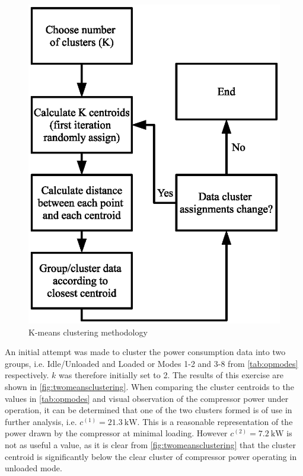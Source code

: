 \begin{figure}
\includegraphics[width = .9\columnwidth]{./Images/ClusteringOverview.eps}
\caption{K-means clustering methodology}
\label{fig:clusteroverview}
\end{figure}

An initial attempt was made to cluster the power consumption data into two groups, i.e. Idle/Unloaded and Loaded or Modes 1-2 and 3-8 from \autoref{tab:opmodes} respectively. $k$ was therefore initially set to 2. The results of this exercise are shown in \autoref{fig:twomeansclustering}. When comparing the cluster centroids to the values in \autoref{tab:opmodes} and visual observation of the compressor power under operation, it can be determined that one of the two clusters formed is of use in further analysis, i.e. $c^{(1)} = \SI{21.3}{\kilo \watt}.$ This is a reasonable representation of the power drawn by the compressor at minimal loading. However $c^{(2)} = \SI{7.2}{\kilo \watt}$ is not as useful a value, as it is clear from \autoref{fig:twomeansclustering} that the cluster centroid is significantly below the clear cluster of compressor power operating in unloaded mode.

